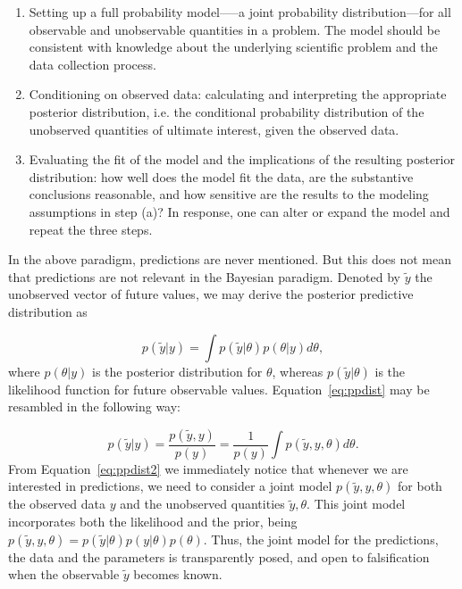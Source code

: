 \documentclass{statsoc}
\begin{document}
\begin{enumerate}
\item Setting up a full probability model—--a joint probability distribution---for all observable and unobservable quantities 
           in a problem. The model should be consistent with knowledge about the underlying scientific problem and the data collection 
           process.
\item Conditioning on observed data: calculating and interpreting the appropriate posterior distribution, i.e. the conditional probability 
           distribution of the unobserved quantities of ultimate interest, given the observed data.
\item Evaluating the fit of the model and the implications of the resulting posterior distribution: how well does the model fit the 
           data, are the substantive conclusions reasonable, and how sensitive are the results to the modeling assumptions in step (a)? 
           In response, one can alter or expand the model and repeat the three steps.
\end{enumerate}
%
In the above paradigm, predictions are never mentioned. But this does not mean that predictions are not relevant in the Bayesian paradigm. Denoted by $\tilde{y}$ the unobserved vector of future values, we may derive the posterior predictive distribution as

\begin{equation}
p(\tilde{y}|y) = \int p(\tilde{y}|\theta)p(\theta|y) d\theta,
\label{eq:ppdist}
\end{equation}
%
where $p(\theta|y)$ is the posterior distribution for $\theta$, whereas $p(\tilde{y}|\theta)$ is the likelihood function for future observable values.
%
%
Equation~\eqref{eq:ppdist} may be resambled in the following way:

\begin{equation}
p(\tilde{y}|y) = \frac{p(\tilde{y},y)}{p(y)}= \frac{1}{p(y)}\int p(\tilde{y},y,\theta)d\theta.
\label{eq:ppdist2}
\end{equation}
%
From Equation~\eqref{eq:ppdist2} we immediately notice that whenever we are interested in predictions, we need to consider a joint model $p(\tilde{y},y,\theta)$ for both the observed data $y$ and the unobserved quantities $\tilde{y},\theta$. This joint model incorporates both the likelihood and the prior, being $p(\tilde{y},y,\theta) = p(\tilde{y}|\theta)p(y|\theta)p(\theta)$. Thus, the joint model for the predictions, the data and the parameters is transparently posed, and open to falsification when the observable $\tilde{y}$ becomes known.
\end{document}
